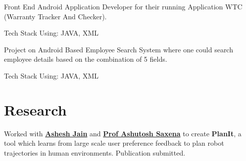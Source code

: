 \documentclass[letterpaper]{deedy-resume} %
\begin{document}
\begin{minipage}[t]{0.66\textwidth}


\begin{tightitemize}
 \item Front End Android Application Developer for their running Application WTC (Warranty Tracker And Checker).
 \item Tech Stack Using: JAVA, XML
\end{tightitemize}

\sectionspace %



\begin{tightitemize}
 \item Project on Android Based Employee Search System where one could search employee details based on the combination of 5 fields.
 \item Tech Stack Using: JAVA, XML
\end{tightitemize}


\section{Research}


Worked with \textbf{\href{http://www.cs.cornell.edu/~ashesh/}{Ashesh Jain}} and \textbf{\href{http://www.cs.cornell.edu/~asaxena/}{Prof Ashutosh Saxena}} to create \textbf{PlanIt}, a tool which learns from large scale user preference feedback to plan robot trajectories in human environments. Publication submitted.

\sectionspace %




\end{minipage}
\end{document}
